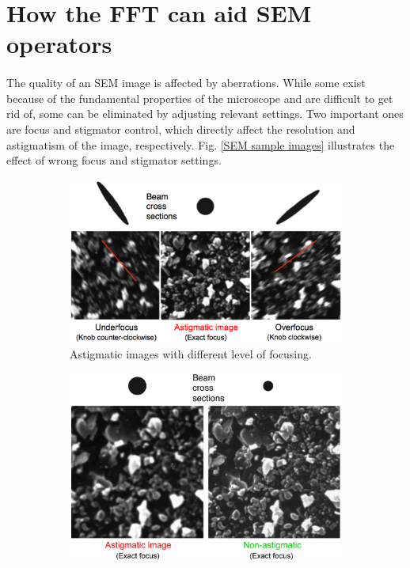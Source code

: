 \documentclass[12pt, twocolumn]{report}
\begin{document}
\section{How the FFT can aid SEM operators}
\paragraph{}
The quality of an SEM image is affected by aberrations. While some exist because of the fundamental properties of the microscope and are difficult to get rid of, some can be eliminated by adjusting relevant settings. Two important ones are focus and stigmator control, which directly affect the resolution and astigmatism of the image, respectively. Fig. \ref{SEM sample images} illustrates the effect of wrong focus and stigmator settings.

\begin{figure}[htbp]
    \centering
    \begin{subfigure}{0.45\textwidth}
        \centering
        \includegraphics[width=1\textwidth]{Figures/SEM sample images astigmatism a.jpeg}
        \caption{Astigmatic images with different level of focusing.}
    \end{subfigure}
    \begin{subfigure}{0.45\textwidth}
        \centering
        \includegraphics[width=1\textwidth]{Figures/SEM sample images astigmatism b.jpeg}

\end{subfigure}
\end{figure}
\end{document}
